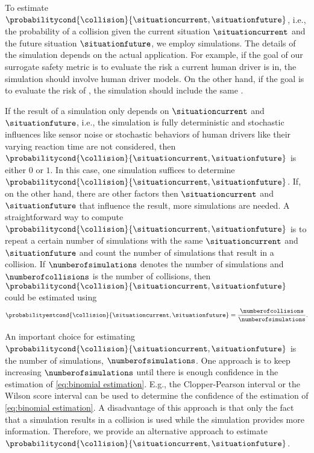 To estimate $\probabilitycond{\collision}{\situationcurrent, \situationfuture}$, i.e., the probability of a collision given the current situation $\situationcurrent$ and the future situation $\situationfuture$, we employ simulations. 
The details of the simulation depends on the actual application. 
For example, if the goal of our surrogate safety metric is to evaluate the risk a current human driver is in, the simulation should involve human driver models. 
On the other hand, if the goal is to evaluate the risk of , the simulation should include the same .

If the result of a simulation only depends on $\situationcurrent$ and $\situationfuture$, i.e., the simulation is fully deterministic and stochastic influences like sensor noise or stochastic behaviors of human drivers like their varying reaction time are not considered, then $\probabilitycond{\collision}{\situationcurrent, \situationfuture}$ is either $0$ or $1$.
In this case, one simulation suffices to determine $\probabilitycond{\collision}{\situationcurrent, \situationfuture}$.
If, on the other hand, there are other factors then $\situationcurrent$ and $\situationfuture$ that influence the result, more simulations are needed.
A straightforward way to compute $\probabilitycond{\collision}{\situationcurrent, \situationfuture}$ is to repeat a certain number of simulations with the same $\situationcurrent$ and $\situationfuture$ and count the number of simulations that result in a collision.
If $\numberofsimulations$ denotes the number of simulations and $\numberofcollisions$ is the number of collisions, then $\probabilitycond{\collision}{\situationcurrent, \situationfuture}$ could be estimated using
\begin{equation}
	\label{eq:binomial estimation}
	\probabilityestcond{\collision}{\situationcurrent, \situationfuture}
	= \frac{\numberofcollisions}{\numberofsimulations}.
\end{equation}

An important choice for estimating $\probabilitycond{\collision}{\situationcurrent, \situationfuture}$ is the number of simulations, $\numberofsimulations$.
One approach is to keep increasing $\numberofsimulations$ until there is enough confidence in the estimation of \cref{eq:binomial estimation}.
E.g., the Clopper-Pearson interval \autocite{clopper1934use} or the Wilson score interval \autocite{wilson1927probable} can be used to determine the confidence of the estimation of \cref{eq:binomial estimation}.
A disadvantage of this approach is that only the fact that a simulation results in a collision is used while the simulation provides more information. 
Therefore, we provide an alternative approach to estimate $\probabilitycond{\collision}{\situationcurrent, \situationfuture}$.


